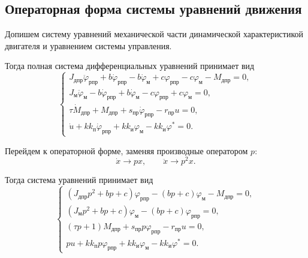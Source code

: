 \subsection{Операторная форма системы уравнений движения}

Допишем систему уравнений механической части динамической характеристикой двигателя и уравнением системы управления.

Тогда полная система дифференциальных уравнений принимает вид
\begin{equation}
\begin{cases}
    J_{\text{дпр}}
    \ddot{\varphi}_{\text{рпр}}
    +
    b
    \dot{\varphi}_{\text{рпр}}
    -
    b
    \dot{\varphi}_{\text{м}}
    +
    c
    \varphi_{\text{рпр}}
    -
    c
    \varphi_{\text{м}}
    -
    M_{\text{дпр}}
    =
    0,
    \\[0.4em]

    J_{\text{м}}
    \ddot{\varphi}_{\text{м}}
    -
    b
    \dot{\varphi}_{\text{рпр}}
    +
    b
    \dot{\varphi}_{\text{м}}
    -
    c
    \varphi_{\text{рпр}}
    +
    c
    \varphi_{\text{м}}
    =
    0,
    \\[0.4em]

    \tau
    \dot{M}_{\text{дпр}}
    +
    M_{\text{дпр}}
    +
    s_{\text{пр}}
    \dot{\varphi}_{\text{рпр}}
    -
    r_{\text{пр}}u
    =
    0,
    \\[0.4em]

    \dot{u}
    +
    k k_{\text{п}}
    \dot{\varphi}_{\text{рпр}}
    +
    k k_{\text{и}}
    \varphi_{\text{м}}
    -
    k k_{\text{и}}
    \varphi^*
    =
    0.
\end{cases}
\end{equation}

Перейдем к операторной форме, заменяя производные оператором $p$:
\[
    \dot{x}
    \rightarrow
    p x,
    \qquad
    \ddot{x}
    \rightarrow
    p^2 x.
\]

Тогда система уравнений принимает вид
\begin{equation}
\begin{cases}
    \left(
        J_{\text{дпр}}p^2
        +
        bp
        +
        c
    \right)
    \varphi_{\text{рпр}}
    -
    \left(
        bp+c
    \right)
    \varphi_{\text{м}}
    -
    M_{\text{дпр}}
    =
    0,
    \\[0.4em]

    \left(
        J_{\text{м}}p^2
        +
        bp
        +
        c
    \right)
    \varphi_{\text{м}}
    -
    \left(
        bp+c
    \right)
    \varphi_{\text{рпр}}
    =
    0,
    \\[0.4em]

    \left(
        \tau p+1
    \right)
    M_{\text{дпр}}
    +
    s_{\text{пр}}p
    \varphi_{\text{рпр}}
    -
    r_{\text{пр}}u
    =
    0,
    \\[0.4em]

    pu
    +
    k k_{\text{п}}p
    \varphi_{\text{рпр}}
    +
    k k_{\text{и}}
    \varphi_{\text{м}}
    -
    k k_{\text{и}}
    \varphi^*
    =
    0.
\end{cases}
\end{equation}
